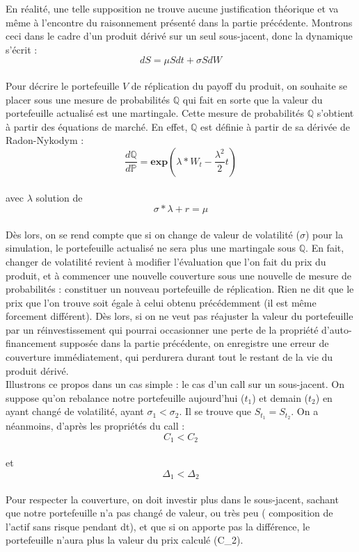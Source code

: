 \documentclass[french,12pt,a4paper]{article}
\begin{document}
En réalité, une telle supposition ne trouve aucune justification théorique et va même à l'encontre du raisonnement présenté dans la partie précédente. Montrons ceci dans le cadre d'un produit dérivé sur un seul sous-jacent, donc la dynamique s’écrit : 
\\$$ dS = \mu Sdt + \sigma SdW $$  \\
Pour décrire le portefeuille $V$ de réplication du payoff du produit, on souhaite se placer sous une mesure de probabilités $\mathbb{Q}$ qui fait en sorte que la valeur du portefeuille actualisé est une martingale. Cette mesure de probabilités $\mathbb{Q}$ s'obtient à partir des équations de marché. En effet, $\mathbb{Q}$ est définie à partir de sa dérivée de Radon-Nykodym :\\
$$\frac{d\mathbb{Q}}{d\mathbb{P}}= \textbf{exp}(\lambda * W_{t} - \frac{\lambda^{2}}{2}t) $$ \\

avec $\lambda$ solution de $$ \sigma * \lambda + r = \mu $$ \\

Dès lors, on se rend compte que si on change de valeur de volatilité ($\sigma$) pour la simulation, le portefeuille actualisé ne sera plus une martingale sous $\mathbb{Q}$. En fait, changer de volatilité revient à modifier l'évaluation que l'on fait du prix du produit, et à commencer une nouvelle couverture sous une nouvelle de mesure de probabilités : constituer un nouveau portefeuille de réplication. Rien ne dit que le prix que l'on trouve soit égale à celui obtenu précédemment (il est même forcement différent). Dès lors, si on ne veut pas réajuster la valeur du portefeuille par un réinvestissement qui pourrai occasionner une perte de la propriété d'auto-financement supposée dans la partie précédente, on enregistre une erreur de couverture immédiatement, qui perdurera durant tout le restant de la vie du produit dérivé.\\

Illustrons ce propos dans un cas simple : le cas d'un call sur un sous-jacent. On suppose qu'on rebalance notre portefeuille aujourd'hui ($t_{1}$) et demain ($t_{2}$) en ayant changé de volatilité, ayant $\sigma_{1}<\sigma_{2}$. Il se trouve que $S_{t_{1}}=S_{t_{2}}$. On a néanmoins, d'après les propriétés du call : \\
$$C_{1}<C_{2}$$\\ et $$\Delta_{1}<\Delta_{2}$$ \\
Pour respecter la couverture, on doit investir plus dans le sous-jacent, sachant que notre portefeuille n'a pas changé de valeur, ou très peu ( composition de l'actif sans risque pendant dt), et que si on apporte pas la différence, le portefeuille n'aura plus la valeur du prix calculé (C_{2}).\\
\end{document}
